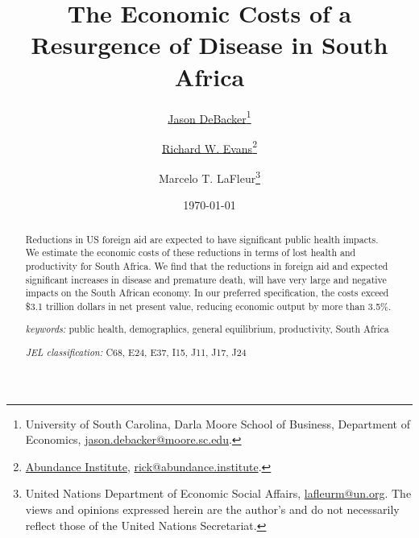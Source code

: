 \documentclass[letterpaper,12pt]{article}
\theoremstyle{definition}
\begin{document}
\begin{titlepage}
\title{The Economic Costs of a Resurgence of Disease in South Africa}
\date{\today}
\author{\href{http://jasondebacker.com/}{Jason DeBacker}\thanks{University of South Carolina, Darla Moore School of Business, Department of Economics, \href{mailto:jason.debacker@moore.sc.edu}{jason.debacker@moore.sc.edu}.}\and \href{https://sites.google.com/site/rickecon}{Richard W. Evans}\thanks{\href{https://abundance.institute/}{Abundance Institute}, \href{mailto:rick@abundance.institute}{rick@abundance.institute}.}\and {Marcelo T. LaFleur}\thanks{{United Nations Department of Economic Social Affairs}, \href{mailto:lafleurm@un.org}{lafleurm@un.org}. The views and opinions expressed herein are the author's and do not necessarily reflect those of the United Nations Secretariat.}}
\maketitle
\vspace{-2mm}
\begin{abstract}
\small{Reductions in US foreign aid are expected to have significant public health impacts.  We estimate the economic costs of these reductions in terms of lost health and productivity for South Africa.  We find that the reductions in foreign aid and expected significant increases in disease and premature death, will have very large and negative impacts on the South African economy.  In our preferred specification, the costs exceed \$3.1 trillion dollars in net present value, reducing economic output by more than 3.5\%.}

\vspace{10mm}

\noindent\textit{keywords:}\: public health, demographics, general equilibrium, productivity, South Africa

\vspace{10mm}

\noindent\textit{JEL classification:} C68, E24, E37, I15, J11, J17, J24


\end{abstract}
\thispagestyle{empty}
\end{titlepage}
\end{document}
